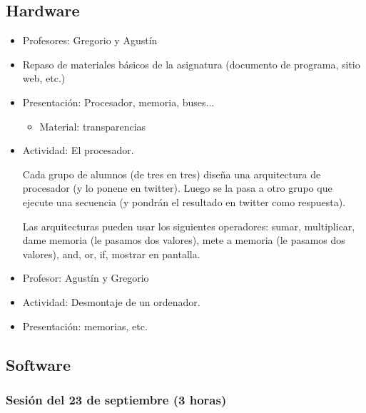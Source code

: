 \documentclass[a4paper,12pt]{article}
\begin{document}
\subsection{Hardware}

\begin{itemize}
\item Profesores: Gregorio y Agustín

\item Repaso de materiales básicos de la asignatura (documento de programa, sitio web, etc.)

\item Presentación: Procesador, memoria, buses...
  \begin{itemize}
  \item Material: transparencias
  \end{itemize}

\item Actividad: El procesador.

  Cada grupo de alumnos (de tres en tres) diseña una arquitectura de procesador (y lo ponene en twitter). Luego se la pasa a otro grupo que ejecute una secuencia (y pondrán el resultado en twitter como respuesta).

  Las arquitecturas pueden usar los siguientes operadores: sumar, multiplicar, dame memoria (le pasamos dos valores), mete a memoria (le pasamos dos valores), and, or, if, mostrar en pantalla.
\end{itemize}

\begin{itemize}
\item Profesor: Agustín y Gregorio
\item Actividad: Desmontaje de un ordenador.
\item Presentación: memorias, etc.
\end{itemize}


\subsection{Software}

\subsubsection{Sesión del 23 de septiembre (3 horas)}
\end{document}
